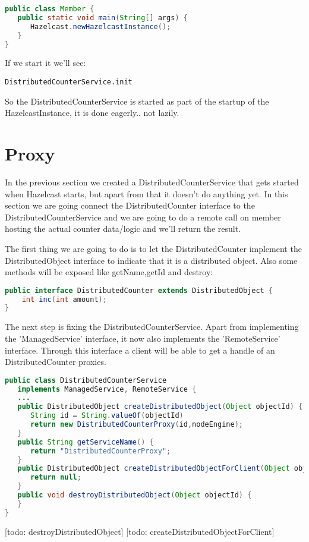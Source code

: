 \begin{lstlisting}[language=java]
public class Member {
   public static void main(String[] args) {
      Hazelcast.newHazelcastInstance();
   }
}
\end{lstlisting}
If we start it we'll see:
\begin{lstlisting}
DistributedCounterService.init
\end{lstlisting}
So the DistributedCounterService is started as part of the startup of the HazelcastInstance, it is done eagerly.. not lazily.

\section{Proxy}
In the previous section we created a DistributedCounterService that gets started when Hazelcast starts, but apart from that it doesn't do anything yet. In this section we are going connect the DistributedCounter interface to the DistributedCounterService and we are going to do a remote call on member hosting the actual counter data/logic and we'll return the result.

The first thing we are going to do is to let the DistributedCounter implement the DistributedObject interface to indicate that it is a distributed object. Also some methods will be exposed like getName,getId and destroy:
\begin{lstlisting}[language=java]
public interface DistributedCounter extends DistributedObject {
    int inc(int amount);
}
\end{lstlisting}

The next step is fixing the DistributedCounterService. Apart from implementing the 'ManagedService' interface, it now also implements the 'RemoteService' interface. Through this interface a client will be able to get a handle of an DistributedCounter proxies. 
\begin{lstlisting}[language=java]
public class DistributedCounterService 
   implements ManagedService, RemoteService {
   ...  
   public DistributedObject createDistributedObject(Object objectId) {
      String id = String.valueOf(objectId)
      return new DistributedCounterProxy(id,nodeEngine);
   }
   public String getServiceName() {
      return "DistributedCounterProxy";
   }
   public DistributedObject createDistributedObjectForClient(Object objectId) {
      return null;
   }
   public void destroyDistributedObject(Object objectId) {
   }
}
\end{lstlisting}
[todo: destroyDistributedObject]
[todo: createDistributedObjectForClient]

